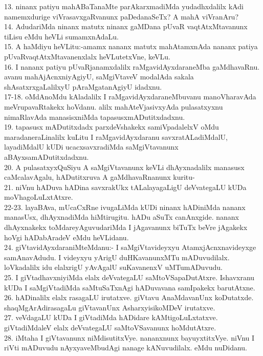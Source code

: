 \documentclass{article}
\begin{document}
13. ninanx patiyu mahABaTanaMte parAkarxmadiMda yudadhxdalilx kAdi namemxdurige viVrasavxgaRvanunx paDedanaSeTx? A mahA viVranAru?\\
14. AdudariMda ninanx matutx ninanx gaMDana pUvaR vaqtAtxMtavanunx tiLisu eMdu heVLi sumamxnAdaLu.\\
15. A haMdiyu heVLitu:-amamx nananx matutx mahAtamxnAda nananx patiya pUvaRvaqtAtxMtavanenxlalx heVLutetxVne, keVLu.\\
16. I nananx patiyu pUvaRjanamxdalilx raMgavidAyxdaraneMba gaMdhavaRnu. avanu mahAjAcnxniyAgiyU, saMgiVtaveV modalAda sakala shAsatxrxgaLalilxyU pAraMgatanAgiyU idadxnu.\\
17-18. oMdAnoMdu kAladalilx I raMgavidAyxdaraneMbuvanu manoVharavAda meVrupavaRtakekx hoVdanu. alilx mahAteVjasivxyAda pulasatxyxnu nimaRlavAda manasisxniMda tapasusxmADutitxdadxnu.\\
19. tapasusx mADutitxdadx parxdeVshakekx samiVpadalelxV oMdu maradaneraLinalilx kuLitu I raMgavidAyxdaranu savxratALadiMdalU, layadiMdalU kUDi ucacxsavxradiMda saMgiVtavanunx aBAyxsamADutitxdadxnu.\\
20. A pulasatxyxQuSiyu A saMgiVtavanunx keVLi dhAyxnadalilx manasusx caMcalavAgalu, hADutitxruva A gaMdhavaRnanunx kuritu-\\
21. niVnu hADuva hADina savxrakUkx tALalayagaLigU deVvategaLU kUDa moVhagoLuLxtAtxre.\\
22-23. layaBAva, mUcaCxRne ivugaLiMda kUDi ninanx hADiniMda nananx manasUsx, dhAyxnadiMda hiMtirugitu. hADu aSuTx canAnxgide. nananx dhAyxnakekx toMdareyAguvudariMda I jAgavanunx biTuTx beVre jAgakekx hoVgi hADabAradeV eMdu heVLidanu.\\
24. giVtavidAyxdaraniMteMdanu:- I saMgiVtavideyxyu AtamxjAcnxnavideyxge samAnavAdudu. I videyxyu yArigU duHKavanunxMTu mADuvudilalx. loVkadalilx idu elalxrigU yAvAgalU suKavanenxV uMTumADuvudu.\\
25. I giVtadhavxniyiMda elalx deVvategaLU saMtoVSapaDutAtxre. Ishavxranu kUDa I saMgiVtadiMda saMtuSaTxnAgi hADuvavana samIpakekx barutAtxne.\\
26. hADinalilx elalx rasagaLU irutatxve. giVtavu AnaMdavanUnx koDutatxde. shaqMgArAdirasagaLu giVtavanUnx AsharxyisikoMDeV irutatxve.\\
27. veVdagaLU kUDa I giVtadiMda hADidare kAMtigoLuLxtatxve. giVtadiMdaleV elalx deVvategaLU saMtoVSavanunx hoMdutAtxre.\\
28. iMtaha I giVtavanunx niMdisutitxVye. nananxnunx bayuyxtitxVye. niVnu I riVti mADuvudu nAyxyaveMbudAgi nanage kANuvudilalx. eMdu nuDidanu.\\
\end{document}
